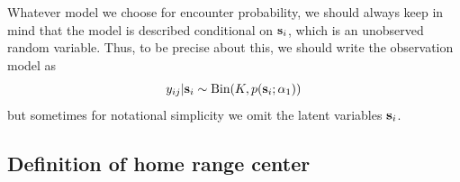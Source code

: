 Whatever model we choose for encounter probability, we should always keep
in mind that the model is described conditional on ${\bf s}_{i}$,
which is an unobserved random variable.  Thus, to be precise about
this, we should write the observation model as
\[
y_{ij}|{\bf s}_{i} \sim \mbox{Bin}(K, p({\bf s}_{i};\alpha_{1}))
\]
but sometimes for notational simplicity we omit the latent variables
${\bf s}_{i}$.

\subsection{Definition of home range center}

